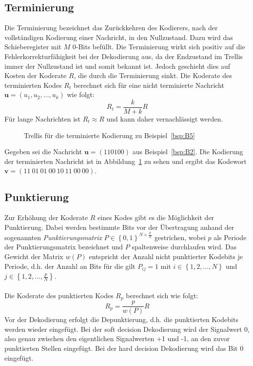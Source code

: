 \subsection{Terminierung}
\label{kapitel:grundlageen_terminierung}
Die Terminierung bezeichnet das Zurückkehren des Kodierers, nach der vollständigen Kodierung einer Nachricht, in den Nullzustand. Dazu wird das Schieberegister mit $M$ 0-Bits befüllt. Die Terminierung wirkt sich positiv auf die Fehlerkorrekturfähigkeit bei der Dekodierung aus, da der Endzustand im Trellis immer der Nullzustand ist und somit bekannt ist. Jedoch geschieht dies auf Kosten der Koderate $R$, die durch die Terminierung sinkt. Die Koderate des terminierten Kodes $R_{t}$ berechnet sich für eine nicht terminierte Nachricht $\mathbf{u}=\left( u_{1},u_{2},\dots ,u_{k}\right)$ wie folgt:
\begin{equation}
R_{t}=\frac{k}{M+k}R
\end{equation}
Für lange Nachrichten ist $R_{t}\approx R$ und kann daher vernachlässigt werden.
\begin{figure}[t]

\caption{Trellis für die terminierte Kodierung zu Beispiel~\ref{bsp:B5}}
\label{abb:trellis_terminiert}
\end{figure}
\begin{beispiel}
Gegeben sei die Nachricht $\mathbf{u}=\left( 110100\right)$ aus Beispiel~\ref{bsp:B2}. Die Kodierung der terminierten Nachricht ist in Abbildung~\ref{abb:trellis_terminiert} zu sehen und ergibt das Kodewort $\mathbf{v}=\left( 11~01~01~00~10~11~00~00\right)$.
\label{bsp:B5}
\end{beispiel}

\subsection{Punktierung}
\label{kapitel:grundlagen_punktierung}
Zur Erhöhung der Koderate $R$ eines Kodes gibt es die Möglichkeit der Punktierung. Dabei werden bestimmte Bits vor der Übertragung anhand der sogenannten \emph{Punktierungsmatrix} $P \in {\left\lbrace 0,1 \right\rbrace}^{N\times \frac{p}{N}}$ gestrichen, wobei $p$ als Periode der Punktierungsmatrix bezeichnet und $P$ spaltenweise durchlaufen wird. Das Gewicht der Matrix $w(P)$ entspricht der Anzahl nicht punktierter Kodebits je Periode, d.h. der Anzahl an Bits für die gilt $P_{ij}=1$ mit $i \in \left\lbrace 1,2,\dots ,N \right\rbrace$ und $j \in \left\lbrace 1,2,\dots ,\frac{p}{N} \right\rbrace$.~\cite[S.~218]{schonfeld2012informations}
\\
\\
Die Koderate des punktierten Kodes $R_{p}$ berechnet sich wie folgt:
\begin{equation}
R_{p}=\frac{p}{w(P)}R
\end{equation}
Vor der Dekodierung erfolgt die Depunktierung, d.h. die punktierten Kodebits werden wieder eingefügt. Bei der soft decision Dekodierung wird der Signalwert 0, also genau zwischen den eigentlichen Signalwerten +1 und -1, an den zuvor punktierten Stellen eingefügt. Bei der hard decision Dekodierung wird das Bit 0 eingefügt.

